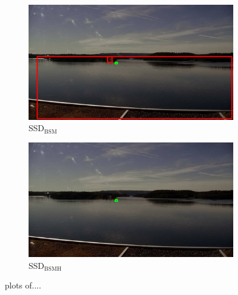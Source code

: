 \begin{figure}[h!]
\begin{subfigure}{.5\textwidth}
  \centering
  \includegraphics[width=0.9\linewidth]{results/case_buildings/bigbox_bcbf/SSD2/selected_08_07_frame0290.jpg}
  \caption{SSD$_{\text{BSM}}$}
  \label{fig:sfig1}
\end{subfigure}%
\begin{subfigure}{.5\textwidth}
  \centering
  \includegraphics[width=.9\linewidth]{results/case_buildings/bigbox_bcbf/SSD3/selected_08_07_frame0290.jpg}
  \caption{SSD$_{\text{BSMH}}$}
  \label{fig:sfig2}
\end{subfigure}

\caption{plots of....}
\label{fig:fig}
\end{figure}

